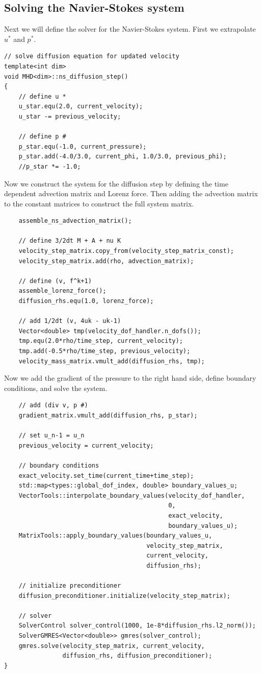 \documentclass{article}
\begin{document}
\subsection*{Solving the Navier-Stokes system}
Next we will define the solver for the Navier-Stokes system. First we extrapolate $u^*$ and $p^*$.
\begin{lstlisting}
// solve diffusion equation for updated velocity
template<int dim>
void MHD<dim>::ns_diffusion_step()
{
    // define u *
    u_star.equ(2.0, current_velocity);
    u_star -= previous_velocity;

    // define p #
    p_star.equ(-1.0, current_pressure);
    p_star.add(-4.0/3.0, current_phi, 1.0/3.0, previous_phi);
    //p_star *= -1.0;
\end{lstlisting}
Now we construct the system for the diffusion step by defining the time dependent advection matrix and Lorenz force. Then adding the advection matrix to the constant matrices to construct the full system matrix. 
\begin{lstlisting}
    assemble_ns_advection_matrix();

    // define 3/2dt M + A + nu K
    velocity_step_matrix.copy_from(velocity_step_matrix_const);
    velocity_step_matrix.add(rho, advection_matrix);

    // define (v, f^k+1)
    assemble_lorenz_force();
    diffusion_rhs.equ(1.0, lorenz_force);

    // add 1/2dt (v, 4uk - uk-1)
    Vector<double> tmp(velocity_dof_handler.n_dofs());
    tmp.equ(2.0*rho/time_step, current_velocity);
    tmp.add(-0.5*rho/time_step, previous_velocity);
    velocity_mass_matrix.vmult_add(diffusion_rhs, tmp);
\end{lstlisting}
Now we add the gradient of the pressure to the right hand side, define boundary conditions, and solve the system.
\begin{lstlisting}
    // add (div v, p #)
    gradient_matrix.vmult_add(diffusion_rhs, p_star);

    // set u_n-1 = u_n
    previous_velocity = current_velocity;

    // boundary conditions
    exact_velocity.set_time(current_time+time_step);
    std::map<types::global_dof_index, double> boundary_values_u;
    VectorTools::interpolate_boundary_values(velocity_dof_handler,
                                             0,
                                             exact_velocity,
                                             boundary_values_u);
    MatrixTools::apply_boundary_values(boundary_values_u,
                                       velocity_step_matrix,
                                       current_velocity,
                                       diffusion_rhs);

    // initialize preconditioner
    diffusion_preconditioner.initialize(velocity_step_matrix);

    // solver
    SolverControl solver_control(1000, 1e-8*diffusion_rhs.l2_norm());
    SolverGMRES<Vector<double>> gmres(solver_control);
    gmres.solve(velocity_step_matrix, current_velocity,
                diffusion_rhs, diffusion_preconditioner);
}
\end{lstlisting}
\end{document}
